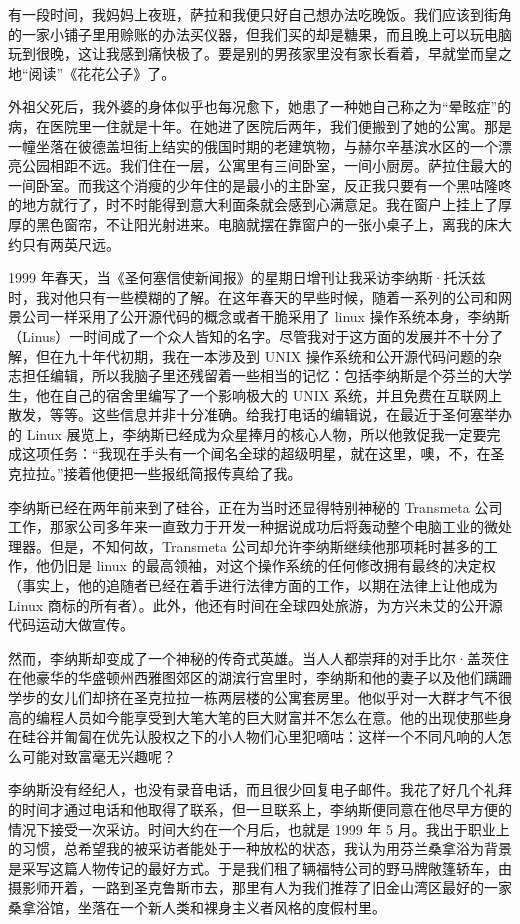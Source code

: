 有一段时间，我妈妈上夜班，萨拉和我便只好自己想办法吃晚饭。我们应该到街角的一家小铺子里用赊账的办法买仪器，但我们买的却是糖果，而且晚上可以玩电脑玩到很晚，这让我感到痛快极了。要是别的男孩家里没有家长看着，早就堂而皇之地“阅读”《花花公子》了。

外祖父死后，我外婆的身体似乎也每况愈下，她患了一种她自己称之为“晕眩症”的病，在医院里一住就是十年。在她进了医院后两年，我们便搬到了她的公寓。那是一幢坐落在彼德盖坦街上结实的俄国时期的老建筑物，与赫尔辛基滨水区的一个漂亮公园相距不远。我们住在一层，公寓里有三间卧室，一间小厨房。萨拉住最大的一间卧室。而我这个消瘦的少年住的是最小的主卧室，反正我只要有一个黑咕隆咚的地方就行了，时不时能得到意大利面条就会感到心满意足。我在窗户上挂上了厚厚的黑色窗帘，不让阳光射进来。电脑就摆在靠窗户的一张小桌子上，离我的床大约只有两英尺远。

 
1999 年春天，当《圣何塞信使新闻报》的星期日增刊让我采访李纳斯·托沃兹时，我对他只有一些模糊的了解。在这年春天的早些时候，随着一系列的公司和网景公司一样采用了公开源代码的概念或者干脆采用了 linux 操作系统本身，李纳斯（Linus）一时间成了一个众人皆知的名字。尽管我对于这方面的发展并不十分了解，但在九十年代初期，我在一本涉及到 UNIX 操作系统和公开源代码问题的杂志担任编辑，所以我脑子里还残留着一些相当的记忆：包括李纳斯是个芬兰的大学生，他在自己的宿舍里编写了一个影响极大的 UNIX 系统，并且免费在互联网上散发，等等。这些信息并非十分准确。给我打电话的编辑说，在最近于圣何塞举办的 Linux 展览上，李纳斯已经成为众星捧月的核心人物，所以他敦促我一定要完成这项任务：“我现在手头有一个闻名全球的超级明星，就在这里，噢，不，在圣克拉拉。”接着他便把一些报纸简报传真给了我。

李纳斯已经在两年前来到了硅谷，正在为当时还显得特别神秘的 Transmeta 公司工作，那家公司多年来一直致力于开发一种据说成功后将轰动整个电脑工业的微处理器。但是，不知何故，Transmeta 公司却允许李纳斯继续他那项耗时甚多的工作，他仍旧是 linux 的最高领袖，对这个操作系统的任何修改拥有最终的决定权（事实上，他的追随者已经在着手进行法律方面的工作，以期在法律上让他成为 Linux 商标的所有者）。此外，他还有时间在全球四处旅游，为方兴未艾的公开源代码运动大做宣传。

然而，李纳斯却变成了一个神秘的传奇式英雄。当人人都崇拜的对手比尔·盖茨住在他豪华的华盛顿州西雅图郊区的湖滨行宫里时，李纳斯和他的妻子以及他们蹒跚学步的女儿们却挤在圣克拉拉一栋两层楼的公寓套房里。他似乎对一大群才气不很高的编程人员如今能享受到大笔大笔的巨大财富并不怎么在意。他的出现使那些身在硅谷并匍匐在优先认股权之下的小人物们心里犯嘀咕：这样一个不同凡响的人怎么可能对致富毫无兴趣呢？

李纳斯没有经纪人，也没有录音电话，而且很少回复电子邮件。我花了好几个礼拜的时间才通过电话和他取得了联系，但一旦联系上，李纳斯便同意在他尽早方便的情况下接受一次采访。时间大约在一个月后，也就是 1999 年 5 月。我出于职业上的习惯，总希望我的被采访者能处于一种放松的状态，我认为用芬兰桑拿浴为背景是采写这篇人物传记的最好方式。于是我们租了辆福特公司的野马牌敞篷轿车，由摄影师开着，一路到圣克鲁斯市去，那里有人为我们推荐了旧金山湾区最好的一家桑拿浴馆，坐落在一个新人类和裸身主义者风格的度假村里。

